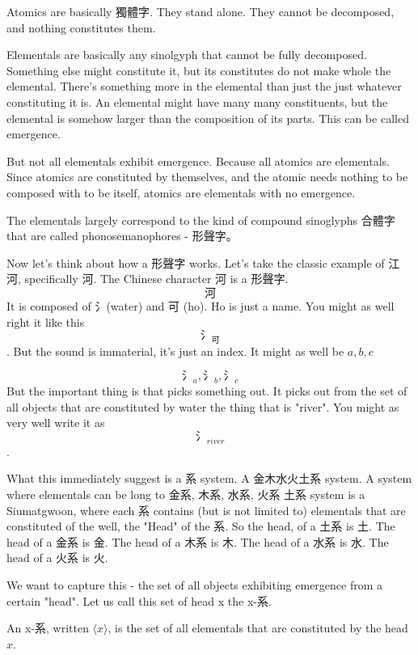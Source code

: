 Atomics are basically 獨體字. They stand alone. They cannot be decomposed, and nothing constitutes them. 

Elementals are basically any sinolgyph that cannot be fully decomposed. Something else might constitute it, but its constitutes do not make whole the elemental. There's something more in the elemental than just the just whatever constituting it is. An elemental might have many many constituents, but the elemental is somehow larger than the composition of its parts. This can be called emergence. 

But not all elementals exhibit emergence. Because all atomics are elementals. Since atomics are constituted by themselves, and the atomic needs nothing to be composed with to be itself, atomics are elementals with no emergence. 

The elementals largely correspond to the kind of compound sinoglyphs 合體字 that are called phonosemanophores - 形聲字。 

Now let's think about how a 形聲字 works. Let's take the classic example of 江河, specifically 河. The Chinese character 河 is a 形聲字. 
$$\text{河}$$
It is composed of 氵(water) and 可 (ho). Ho is just a name. You might as well right it like this $$\text{氵}_{\text{可}}$$. But the sound is immaterial, it's just an index. It might as well be $a,b,c$

$$\text{氵}_{a},\text{氵}_b,\text{氵}_c$$
But the important thing is that picks something out. It picks out from the set of all objects that are constituted by water the thing that is "river". You might as very well write it as $$\text{氵}_{river}$$. 

What this immediately suggest is a 系 system. A 金木水火土系 system. A system where elementals can be long to 金系, 木系, 水系, 火系 土系 system is a Siumatgwoon, where each 系 contains (but is not limited to) elementals that are constituted of the well, the "Head" of the 系. So the head, of a 土系 is 土. The head of a 金系 is 金. The head of a 木系 is 木. The head of a 水系 is 水. The head of a 火系 is 火. 

We want to capture this - the set of all objects exhibiting emergence from a certain "head". Let us call this set of head x the x-系. 


\begin{definition}[x-系]\label{def:x-system}
    An x-系, written $\langle x \rangle$, is the set of all elementals that are constituted by the head $x$.
\end{definition}

